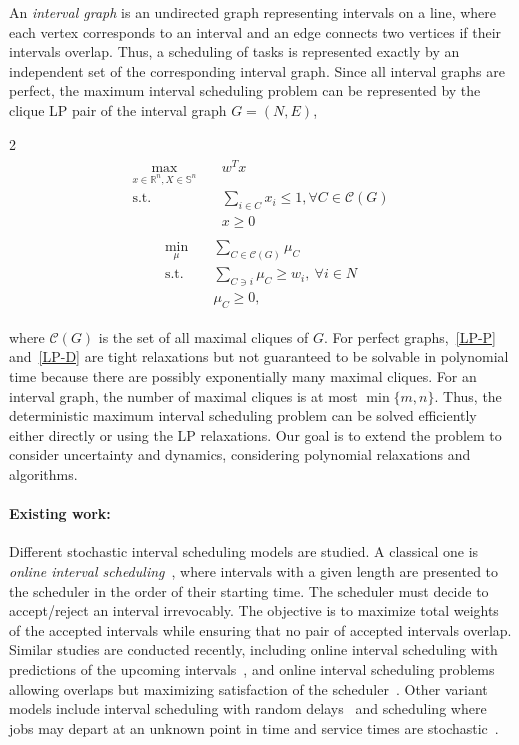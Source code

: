 \documentclass{article}
\newcommand{\R}{\mathbb{R}}
\newcommand{\symm}{\mathbb{S}}
\renewcommand{\symm}{\mathbb{S}}
\begin{document}
An \emph{interval graph} is an undirected graph representing intervals on a line, where each vertex corresponds to an interval and an edge connects two vertices if their intervals overlap.
Thus, a scheduling of tasks is represented exactly by an independent set of the corresponding interval graph.
Since all interval graphs are perfect, the maximum interval scheduling problem can be represented by the clique LP pair of the interval graph $G=(N,E)$,
\vspace{-7pt}
\begin{multicols}{2}
    \noindent
    \begin{align}
\label{LP-P}
\tag{LP-P}
\begin{split}
    \max_{x\in\R^{n},X\in\symm^{n}}\quad &w^T x\\
    \text{s.t.}\quad &\sum_{i\in C}x_i\leq 1, \forall C\in\mathcal{C}(G)\\
    &x\geq 0
\end{split}
\end{align}
\columnbreak
\begin{align}
\label{LP-D}
\tag{LP-D}
\begin{split}
    \min_{\mu}\quad &\sum_{C\in\mathcal{C}(G)}\mu_C\\
    \text{s.t.}\quad &\sum_{C\ni i}\mu_C\geq w_i,~\forall i\in N\\
    &\mu_C\geq 0 ,
\end{split}
\end{align}
\end{multicols}
\vspace{-15pt}
\noindent
where $\mathcal{C}(G)$ is the set of all maximal cliques of $G$.
For perfect graphs,~\eqref{LP-P} and~\eqref{LP-D} are tight relaxations but not guaranteed to be solvable in polynomial time because there are possibly exponentially many maximal cliques.
For an interval graph, the number of maximal cliques is at most $\min\{m, n\}$.
Thus, the deterministic maximum interval scheduling problem can be solved efficiently either directly or using the LP relaxations. 
Our goal is to extend the problem to consider uncertainty and dynamics, considering polynomial relaxations and algorithms.
\paragraph{\textbf{Existing work:}} Different stochastic interval scheduling models are studied.
A classical one is \emph{online interval scheduling}~\cite{Lipton1994OnlineIS}, where intervals with a given length are presented to the scheduler in
the order of their starting time.
The scheduler must decide to accept/reject an interval irrevocably.
The objective is to maximize
total weights of the accepted intervals while ensuring that no pair of accepted
intervals overlap.
Similar studies are conducted recently, including online interval scheduling with predictions of the upcoming intervals~\cite{boyar2025onlineintervalschedulingpredictions}, and online interval scheduling problems allowing overlaps but maximizing satisfaction of the scheduler~\cite{KOBAYASHI2020673}.
Other variant models include interval scheduling with random delays~\cite{BRANDA2024106542} and scheduling where jobs may depart at an unknown point in time and service times are stochastic~\cite{xu2024stochasticschedulingabandonmentsgreedy}.
\end{document}

